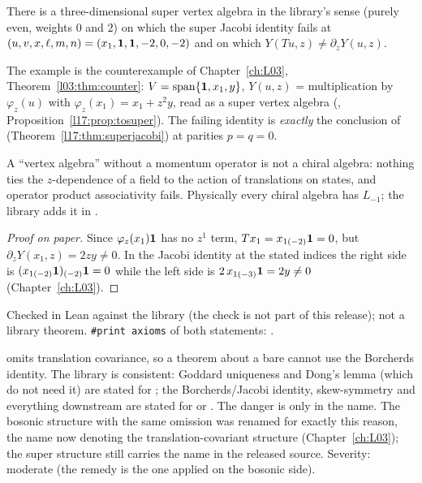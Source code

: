 \begin{theorem}\label{l17:thm:nocov}
There is a three-dimensional super vertex algebra in the library's sense (purely even, weights $0$
and $2$) on which the super Jacobi identity fails at $(u,v,x,\ell,m,n)=(x_1,\mathbf{1},\mathbf{1},-2,0,-2)$
and on which $Y(Tu,z)\neq\partial_zY(u,z)$.
\end{theorem}
\begin{dictionary}
The example is the counterexample of Chapter~\ref{ch:L03}, Theorem~\ref{l03:thm:counter}:
$V=\operatorname{span}\{\mathbf{1},x_1,y\}$, $Y(u,z)$ = multiplication by
$\varphi_z(u)$ with $\varphi_z(x_1)=x_1+z^2y$, read as a super vertex algebra
(, Proposition~\ref{l17:prop:tosuper}). The failing
identity is \emph{exactly} the conclusion of  (Theorem~\ref{l17:thm:superjacobi})
at parities $p=q=0$.
\end{dictionary}
\begin{physics}
A ``vertex algebra'' without a momentum operator is not a chiral algebra: nothing ties the
$z$-dependence of a field to the action of translations on states, and operator product
associativity fails. Physically every chiral algebra has $L_{-1}$; the library adds it in
.
\end{physics}
\begin{proof}[Proof on paper]
Since $\varphi_z(x_1)\mathbf{1}$ has no $z^1$ term, $Tx_1=x_{1(-2)}\mathbf{1}=0$, but
$\partial_zY(x_1,z)=2zy\neq0$. In the Jacobi identity at the stated indices the right side is
$(x_{1(-2)}\mathbf{1})_{(-2)}\mathbf{1}=0$ while the left side is
$2\,x_{1(-3)}\mathbf{1}=2y\neq0$ (Chapter~\ref{ch:L03}).
\end{proof}
\begin{status}
Checked in Lean against the library (the check is not part of this release); not a library theorem.
\texttt{\#print axioms} of both statements: .
\end{status}

\begin{warning}[title={Finding (F2): the bare super vertex algebra has the L03 defect}]
 omits translation covariance, so a theorem about a bare
 cannot use the Borcherds identity. The library is consistent: Goddard
uniqueness and Dong's lemma (which do not need it) are stated for ; the
Borcherds/Jacobi identity, skew-symmetry and everything downstream are stated for 
or . The danger is only in the name. The bosonic structure with the same omission was
renamed  for exactly this reason, the name  now denoting the
translation-covariant structure (Chapter~\ref{ch:L03}); the super structure still carries the name
 in the released source. Severity: moderate (the remedy is the one applied on the bosonic side).
\end{warning}

